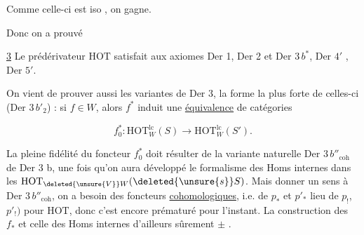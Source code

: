 Comme celle-ci est iso , on gagne.

Donc on a prouvé


\uline{ 3} Le prédérivateur $\mathrm{HOT}$ satisfait aux axiomes Der 1, Der 2  et Der $3\,b^{*}$, Der $4'$ , Der $5'$.





On vient de prouver aussi les variantes  de Der 3, la forme la plus forte de celles-ci (Der $3\,b'_2$) : si $f\in W$, alors $f^*$ induit une \uline{équivalence} de catégories

\[
 f_0^*:\mathrm{HOT}_W^{\mathrm{lc}}(S)\longrightarrow\mathrm{HOT}_W^{\mathrm{lc}}(S').
\]

La pleine fidélité du foncteur $f_0^*$ doit résulter de  la variante naturelle Der $3\,b''_{\mathrm{coh}}$ de Der 3 b, une fois qu'on aura développé le formalisme des  Homs internes dans les $\mathrm{HOT}_{\deleted{\unsure{V}}W}(\deleted{\unsure{s}}S)$. Mais  donner un sens à Der $3\,b''_{\mathrm{coh}}$, on a besoin des foncteurs \uline{cohomologiques}, i.e. de $p_*$ et $p'_*$  lieu de $p_!$, $p'_!)$ pour $\mathrm{HOT}$, donc c'est encore prématuré pour l'instant. La construction des $f_*$ et celle des Homs internes  d'ailleurs sûrement $\pm$ .

